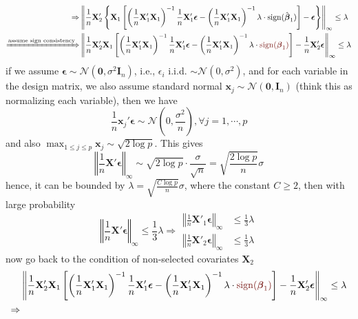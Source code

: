 \documentclass[twoside]{article}
\begin{document}
\begin{itemize}
\begin{align*}
        \Rightarrow & \left\Vert \frac{1}{n}\mathbf{X}_2'\left\{ \mathbf{X}_1 \left[ \left( \frac{1}{n}\mathbf{X}_1' \mathbf{X}_1 \right)^{-1} \frac{1}{n}\mathbf{X}_1'\boldsymbol{\epsilon} - \left( \frac{1}{n}\mathbf{X}_1' \mathbf{X}_1 \right)^{-1} \lambda \cdot \mathrm{sign}(\hat{\boldsymbol{\beta}}_1) \right] -\boldsymbol{\epsilon} \right\} \right\Vert _{\infty} \leq \lambda \\
        \xRightarrow{\text{assume sign consistency}} & \left\Vert \frac{1}{n}\mathbf{X}_2' \mathbf{X}_1 \left[ \left( \frac{1}{n}\mathbf{X}_1' \mathbf{X}_1 \right)^{-1} \frac{1}{n}\mathbf{X}_1'\boldsymbol{\epsilon} - \left( \frac{1}{n}\mathbf{X}_1' \mathbf{X}_1 \right)^{-1} \lambda \cdot \textcolor{myred}{\mathrm{sign}({\boldsymbol{\beta}}_1)} \right]  - \frac{1}{n}\mathbf{X}_2'\boldsymbol{\epsilon} \right\Vert _{\infty} \leq \lambda 
    \end{align*}
    if we assume $\boldsymbol{\epsilon}\sim \mathcal{N}(\mathbf{0},\sigma^2 \mathbf{I}_n)$, i.e., $\epsilon_i$ i.i.d. $\sim \mathcal{N}({0},\sigma^2)$, and for each variable in the design matrix, we also assume standard normal $\mathbf{x}_j\sim \mathcal{N}(\mathbf{0},\mathbf{I}_n)$ (think this as normalizing each variable), then we have 
    $$
    \frac{1}{n}\mathbf{x}_j'\boldsymbol{\epsilon}\sim \mathcal{N}\left(0,\frac{\sigma^2}{n}\right),\forall j=1,\cdots,p
    $$
    and also $ \max_{1\leq j\leq p}\mathbf{x}_j \sim \sqrt{2\log p}$. This gives
    $$
    \left\Vert \frac{1}{n}\mathbf{X}'\boldsymbol{\epsilon} \right\Vert _{\infty} \sim \sqrt{2 \log p}\cdot \frac{\sigma}{\sqrt{n}} = \sqrt{\frac{2\log p}{n}}\sigma
    $$
    hence, it can be bounded by $\lambda = \sqrt{\frac{C\log p}{n}}\sigma $, where the constant $C\geq 2$, then with large probability
    $$
    \left\Vert \frac{1}{n}\mathbf{X}'\boldsymbol{\epsilon} \right\Vert _{\infty} \leq \frac{1}{3}\lambda \Rightarrow \begin{aligned}
        \left\Vert \frac{1}{n}\mathbf{X}'_1\boldsymbol{\epsilon} \right\Vert _{\infty} &\leq \frac{1}{3}\lambda \\
        \left\Vert \frac{1}{n}\mathbf{X}'_2\boldsymbol{\epsilon} \right\Vert _{\infty} &\leq \frac{1}{3}\lambda 
    \end{aligned}
    $$
    now go back to the condition of non-selected covariates $\mathbf{X}_2$
    \begin{align*}
         &\left\Vert \frac{1}{n}\mathbf{X}_2' \mathbf{X}_1 \left[ \left( \frac{1}{n}\mathbf{X}_1' \mathbf{X}_1 \right)^{-1} \frac{1}{n}\mathbf{X}_1'\boldsymbol{\epsilon} - \left( \frac{1}{n}\mathbf{X}_1' \mathbf{X}_1 \right)^{-1} \lambda \cdot \textcolor{myred}{\mathrm{sign}({\boldsymbol{\beta}}_1)} \right]  - \frac{1}{n}\mathbf{X}_2'\boldsymbol{\epsilon} \right\Vert _{\infty} \leq \lambda \\
        \Rightarrow &
    \end{align*}
\end{itemize}
\end{document}
